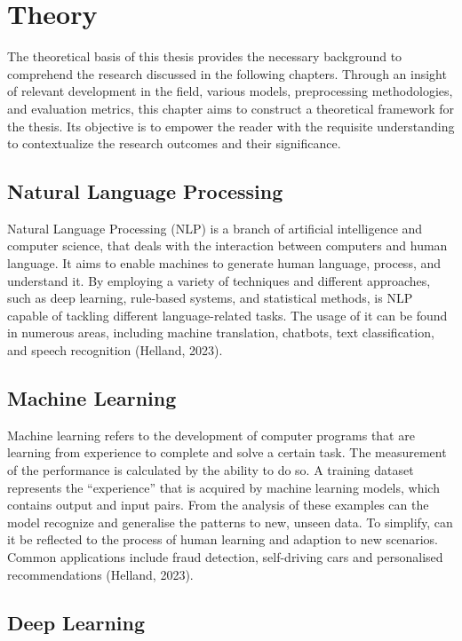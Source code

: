 \chapter{Theory}

The theoretical basis of this thesis provides the necessary background to comprehend the research discussed in the following chapters. Through an insight of relevant development in the field, various models, preprocessing methodologies, and evaluation metrics, this chapter aims to construct a theoretical framework for the thesis. Its objective is to empower the reader with the requisite understanding to contextualize the research outcomes and their significance.

\section{Natural Language Processing}

Natural Language Processing (NLP) is a branch of artificial intelligence and computer science, that deals with the interaction between computers and human language. It aims to enable machines to generate human language, process, and understand it. By employing a variety of techniques and different approaches, such as deep learning, rule-based systems, and statistical methods, is NLP capable of tackling different language-related tasks. The usage of it can be found in numerous areas, including machine translation, chatbots, text classification, and speech recognition (Helland, 2023).

\section{Machine Learning}

Machine learning refers to the development of computer programs that are learning from experience to complete and solve a certain task. The measurement of the performance is calculated by the ability to do so. A training dataset represents the “experience” that is acquired by machine learning models, which contains output and input pairs. From the analysis of these examples can the model recognize and generalise the patterns to new, unseen data. To simplify, can it be reflected to the process of human learning and adaption to new scenarios. Common applications include fraud detection, self-driving cars and personalised recommendations (Helland, 2023).

\section{Deep Learning}

